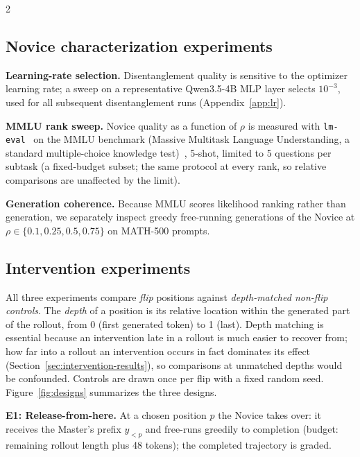 \documentclass[9pt]{article}
\begin{document}
\begin{multicols}{2}
\subsection{Novice characterization experiments}

\textbf{Learning-rate selection.} Disentanglement quality is sensitive to the
optimizer learning rate; a sweep on a representative Qwen3.5-4B MLP layer
selects $10^{-3}$, used for all subsequent disentanglement runs
(Appendix~\ref{app:lr}).

\textbf{MMLU rank sweep.} Novice quality as a function of $\rho$ is measured
with \texttt{lm-eval}~\citep{eval-harness} on the MMLU benchmark (Massive
Multitask Language Understanding, a standard multiple-choice knowledge
test)~\citep{hendrycks2021measuringmassivemultitasklanguage}, 5-shot, limited to
5 questions per subtask
(a fixed-budget subset; the same protocol at every rank, so relative
comparisons are unaffected by the limit).

\textbf{Generation coherence.} Because MMLU scores likelihood ranking rather
than generation, we separately inspect greedy free-running generations of the
Novice at $\rho \in \{0.1, 0.25, 0.5, 0.75\}$ on MATH-500 prompts.

\subsection{Intervention experiments}

All three experiments compare \emph{flip} positions against \emph{depth-matched
non-flip controls}. The \emph{depth} of a position is its relative location
within the generated part of the rollout, from 0 (first generated token) to 1
(last). Depth matching is essential because an intervention late in a rollout
is much easier to recover from; how far into a rollout an intervention occurs
in fact dominates its effect (Section~\ref{sec:intervention-results}), so
comparisons at unmatched depths would be confounded. Controls are drawn once
per flip with a fixed random seed. Figure~\ref{fig:designs} summarizes the
three designs.



\textbf{E1: Release-from-here.} At a chosen position $p$ the Novice takes over:
it receives the Master's prefix $y_{<p}$ and free-runs greedily to completion
(budget: remaining rollout length plus 48 tokens); the completed trajectory is
graded.


\end{multicols}
\end{document}
